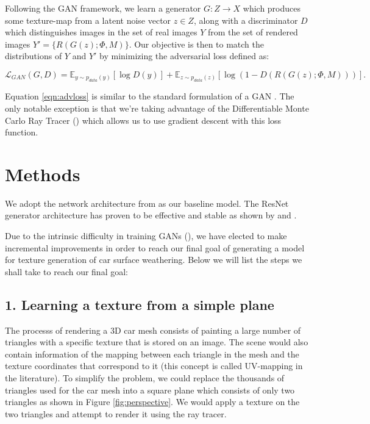 \documentclass[letterpaper,doc,natbib]{apa6}
\begin{document}
Following the GAN framework, we learn a generator $G : Z \rightarrow X$ which produces some texture-map from a latent noise vector $z \in Z$, along with a discriminator $D$ which distinguishes images in the set of real images $Y$ from the set of rendered images $Y' = \{R(G(z); \Phi, M)\}$. Our objective is then to match the distributions of $Y$ and $Y'$ by minimizing the adversarial loss defined as:

\begin{equation} \label{eqn:advloss}
    \mathcal{L}_{GAN}(G, D) = \mathbb{E}_{y \sim p_{data}(y)} [\log D(y)] + \mathbb{E}_{z \sim p_{data}(z)} [\log (1 - D(R(G(z); \Phi, M)))].
\end{equation}

Equation \ref{eqn:advloss} is similar to the standard formulation of a GAN \cite{gan}. The only notable exception is that we're taking advantage of the Differentiable Monte Carlo Ray Tracer (\cite{dmc}) which allows us to use gradient descent with this loss function.

\section{Methods}

We adopt the network architecture from \cite{resnet} as our baseline model. The ResNet generator architecture has proven to be effective and stable as shown by \cite{cyclegan} and \cite{texsyn}.

Due to the intrinsic difficulty in training GANs (\cite{ganhard}), we have elected to make incremental improvements in order to reach our final goal of generating a model for texture generation of car surface weathering. Below we will list the steps we shall take to reach our final goal:

\subsection{1. Learning a texture from a simple plane}

The processs of rendering a 3D car mesh consists of painting a large number of triangles with a specific texture that is stored on an image. The scene would also contain information of the mapping between each triangle in the mesh and the texture coordinates that correspond to it (this concept is called UV-mapping in the literature). To simplify the problem, we could replace the thousands of triangles used for the car mesh into a square plane which consists of only two triangles as shown in Figure \ref{fig:perspective}. We would apply a texture on the two triangles and attempt to render it using the ray tracer.
\end{document}
